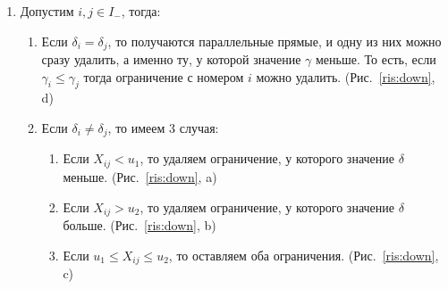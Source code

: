 \documentclass[12pt,a4paper]{article}
\begin{document}
\newpage
\begin{enumerate}
\item Допустим $i,j \in I_{-}$, тогда: \par
\begin{enumerate}
\item Если $\delta_{i}=\delta_{j}$, то получаются параллельные прямые, и одну из них можно сразу удалить, а именно ту, у которой значение $\gamma$ меньше. То есть, если $\gamma_{i}\leqslant \gamma_{j}$ тогда ограничение с номером $i$ можно удалить. (Рис.~\ref{ris:down}, d)

\item Если $\delta_{i}\not=\delta_{j}$, то имеем 3 случая:
\begin{enumerate}
\item Если $X_{ij}<u_{1}$, то удаляем ограничение, у которого значение $\delta$ меньше. (Рис.~\ref{ris:down}, a)
\item Если $X_{ij}>u_{2}$, то удаляем ограничение, у которого значение $\delta$ больше. (Рис.~\ref{ris:down}, b)
\item Если $u_{1}\leqslant X_{ij}\leqslant u_{2}$, то оставляем оба ограничения. (Рис.~\ref{ris:down}, c)
\end{enumerate}
\end{enumerate}


\end{enumerate}
\end{document}
